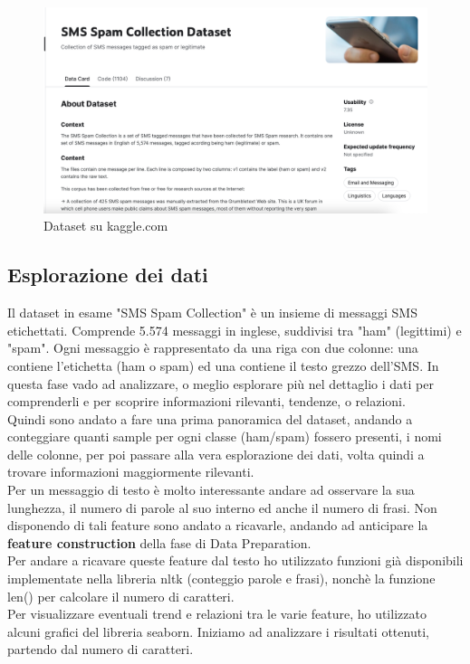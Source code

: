 \documentclass[]{article}
\begin{document}
        \begin{figure}[H]
            \centering
            \includegraphics[width=1\linewidth]{images/kaggleDataset.png}
            \caption{Dataset su kaggle.com}
            \label{fig:enter-label}
        \end{figure}

    \subsection{Esplorazione dei dati}
        Il dataset in esame "SMS Spam Collection" è un insieme di messaggi SMS etichettati. Comprende 5.574 messaggi in inglese, suddivisi tra "ham" (legittimi) e "spam". Ogni messaggio è rappresentato da una riga con due colonne: una contiene l'etichetta (ham o spam) ed una contiene il testo grezzo dell'SMS. In questa fase vado ad analizzare, o meglio esplorare più nel dettaglio i dati per comprenderli e per scoprire informazioni rilevanti, tendenze, o relazioni. \\
        Quindi sono andato a fare una prima panoramica del dataset, andando a conteggiare quanti sample per ogni classe (ham/spam) fossero presenti, i nomi delle colonne, per poi passare alla vera esplorazione dei dati, volta quindi a trovare informazioni maggiormente rilevanti.\\
        Per un messaggio di testo è molto interessante andare ad osservare la sua lunghezza, il numero di parole al suo interno ed anche il numero di frasi. Non disponendo di tali feature sono andato a ricavarle, andando ad anticipare la \textbf{feature construction} della fase di Data Preparation.\\
        Per andare a ricavare queste feature dal testo ho utilizzato funzioni già disponibili implementate nella libreria nltk (conteggio parole e frasi), nonchè la funzione len() per calcolare il numero di caratteri. \\
        Per visualizzare eventuali trend e relazioni tra le varie feature, ho utilizzato alcuni grafici del libreria seaborn. Iniziamo ad analizzare i risultati ottenuti, partendo dal numero di caratteri.
\end{document}
